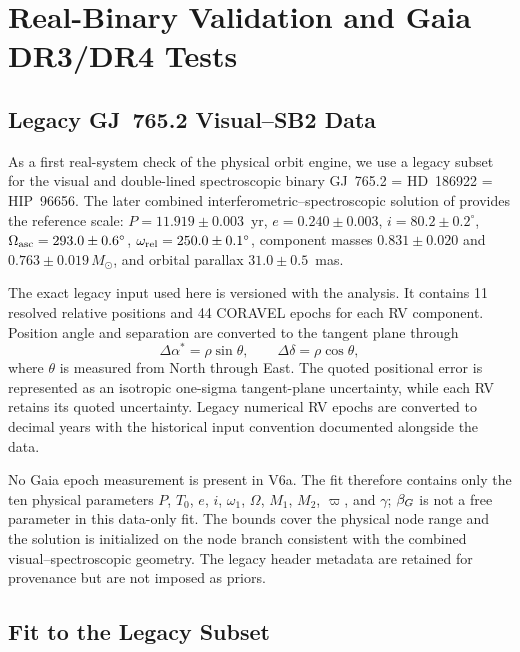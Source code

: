 \section{Real-Binary Validation and Gaia DR3/DR4 Tests}
\label{sect:realdata}

\subsection{Legacy GJ~765.2 Visual--SB2 Data}

As a first real-system check of the physical orbit engine, we use a legacy subset for the visual and double-lined spectroscopic binary GJ~765.2 = HD~186922 = HIP~96656. The later combined interferometric--spectroscopic solution of \citet{Balega2007} provides the reference scale: $P=11.919\pm0.003$~yr, $e=0.240\pm0.003$, $i=80.2\pm0.2^\circ$, $\Omega_{\rm asc}=293.0\pm0.6^\circ$, $\omega_{\rm rel}=250.0\pm0.1^\circ$, component masses $0.831\pm0.020$ and $0.763\pm0.019\,M_\odot$, and orbital parallax $31.0\pm0.5$~mas.

The exact legacy input used here is versioned with the analysis. It contains 11 resolved relative positions and 44 CORAVEL epochs for each RV component. Position angle and separation are converted to the tangent plane through
\begin{equation}
\Delta\alpha^*=\rho\sin\theta,\qquad
\Delta\delta=\rho\cos\theta,
\end{equation}
where $\theta$ is measured from North through East. The quoted positional error is represented as an isotropic one-sigma tangent-plane uncertainty, while each RV retains its quoted uncertainty. Legacy numerical RV epochs are converted to decimal years with the historical input convention documented alongside the data.

No Gaia epoch measurement is present in V6a. The fit therefore contains only the ten physical parameters $P$, $T_0$, $e$, $i$, $\omega_1$, $\Omega$, $M_1$, $M_2$, $\varpi$, and $\gamma$; $\beta_G$ is not a free parameter in this data-only fit. The bounds cover the physical node range and the solution is initialized on the node branch consistent with the combined visual--spectroscopic geometry. The legacy header metadata are retained for provenance but are not imposed as priors.

\subsection{Fit to the Legacy Subset}

